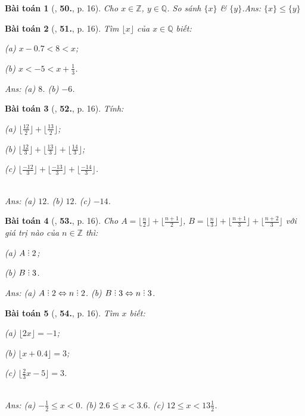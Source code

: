 \documentclass{article}
\numberwithin{equation}{section}
\newtheorem{baitoan}{Bài toán}
\DeclareRobustCommand{\divby}{%
	\mathrel{\vbox{\baselineskip.65ex\lineskiplimit0pt\hbox{.}\hbox{.}\hbox{.}}}%
}
\begin{document}
\begin{baitoan}[\cite{Tuyen_Toan_7}, \textbf{50.}, p. 16]
	Cho $x\in\mathbb{Z}$, $y\in\mathbb{Q}$. So sánh $\{x\}$ \& $\{y\}$.\hfill\textsf{Ans:} $\{x\}\le\{y\}$
\end{baitoan}

\begin{baitoan}[\cite{Tuyen_Toan_7}, \textbf{51.}, p. 16]
	Tìm $\lfloor x\rfloor$ của $x\in\mathbb{Q}$ biết:
	\begin{enumerate*}
		\item[(a)] $x - 0.7 < 8 < x$;
		\item[(b)] $x < -5 < x + \frac{1}{3}$.
	\end{enumerate*}\hfill\textsf{Ans:} (a) $8$. (b) $-6$.
\end{baitoan}

\begin{baitoan}[\cite{Tuyen_Toan_7}, \textbf{52.}, p. 16]
	Tính:
	\begin{enumerate*}
		\item[(a)] $\lfloor\frac{12}{2}\rfloor + \lfloor\frac{13}{2}\rfloor$;
		\item[(b)] $\lfloor\frac{12}{3}\rfloor + \lfloor\frac{13}{3}\rfloor + \lfloor\frac{14}{3}\rfloor$;
		\item[(c)] $\lfloor\frac{-12}{3}\rfloor + \lfloor\frac{-13}{3}\rfloor + \lfloor\frac{-14}{3}\rfloor$.
	\end{enumerate*}\\\mbox{}\hfill\textsf{Ans:} (a) $12$. (b) $12$. (c) $-14$.
\end{baitoan}

\begin{baitoan}[\cite{Tuyen_Toan_7}, \textbf{53.}, p. 16]
	Cho $A = \lfloor\frac{n}{2}\rfloor + \lfloor\frac{n + 1}{2}\rfloor$, $B = \lfloor\frac{n}{3}\rfloor + \lfloor\frac{n + 1}{3}\rfloor + \lfloor\frac{n + 2}{3}\rfloor$ với giá trị nào của $n\in\mathbb{Z}$ thì:
	\begin{enumerate*}
		\item[(a)] $A\divby 2$;
		\item[(b)] $B\divby 3$.
	\end{enumerate*}\hfill\textsf{Ans:} (a) $A\divby 2\Leftrightarrow n\divby 2$. (b) $B\divby 3\Leftrightarrow n\divby 3$.
\end{baitoan}

\begin{baitoan}[\cite{Tuyen_Toan_7}, \textbf{54.}, p. 16]
	Tìm $x$ biết:
	\begin{enumerate*}
		\item[(a)] $\lfloor 2x\rfloor = -1$;
		\item[(b)] $\lfloor x + 0.4\rfloor = 3$;
		\item[(c)] $\lfloor\frac{2}{3}x - 5\rfloor = 3$.
	\end{enumerate*}\\\mbox{}\hfill\textsf{Ans:} (a) $-\frac{1}{2}\le x < 0$. (b) $2.6\le x < 3.6$. (c) $12\le x < 13\frac{1}{2}$.
\end{baitoan}
\end{document}

